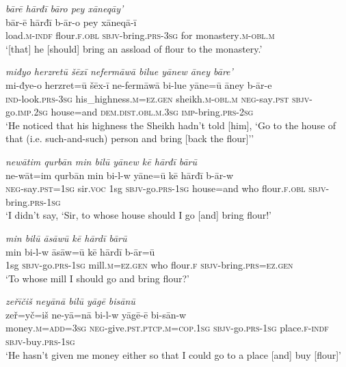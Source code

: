 \ea \label{HB.14}
\textit{bārē hārđī bāro pey xāneqāy’} \\ 
\gll bār-ē hārđī b-ār-o pey xāneqā-ī \\ 
 load\textsc{.m}\textsc{-indf} flour\textsc{\textsc{.f}}\textsc{.obl} \textsc{sbjv-}bring\textsc{.prs}\textsc{-3sg} for monastery\textsc{.m}\textsc{-obl}\textsc{.m} \\ 
\glt `[that] he [should] bring an assload of flour to the monastery.'
\z 
 
\ea \label{HB.17}
\textit{miđyo herzretū šēxī nefermāwā bilue yānew āney bāre’} \\ 
\gll mi-đye-o herzret=ū šēx-ī ne-fermāwā bi-lue yāne=ū āney b-ār-e \\ 
 \textsc{ind-}look\textsc{.prs}\textsc{-3sg} his\_highness\textsc{.m}\textsc{=ez}\textsc{.gen} sheikh\textsc{.m}\textsc{-obl}\textsc{.m} \textsc{neg-}say\textsc{.pst} \textsc{sbjv-}go\textsc{.imp}\textsc{.\textsc{2sg}} house=and \textsc{dem.dist}\textsc{.obl}\textsc{.m}\textsc{.3sg} \textsc{imp-}bring\textsc{.prs}-\textsc{2sg} \\ 
\glt `He noticed that his highness the Sheikh hadn’t told [him], ‘Go to the house of that (i.e. such-and-such) person and bring [back the flour]’'
\z 
 
\ea \label{HB.20}
\textit{newātim qurbān min bilū yānew kē hārđī bārū} \\ 
\gll ne-wāt=im qurbān min bi-l-w yāne=ū kē hārđī b-ār-w \\ 
 \textsc{neg-}say\textsc{.pst}\textsc{=1sg} sir.\textsc{voc} 1sg \textsc{sbjv-}go\textsc{.prs}\textsc{-1sg} house=and who flour\textsc{\textsc{.f}}\textsc{.obl} \textsc{sbjv-}bring\textsc{.prs}\textsc{-1sg} \\ 
\glt `I didn’t say, ‘Sir, to whose house should I go [and] bring flour!'
\z 
 
\ea \label{HB.21}
\textit{min bilū āsāwū kē hārdī bārū} \\ 
\gll min bi-l-w āsāw=ū kē hārdī b-ār=ū \\ 
 1sg \textsc{sbjv-}go\textsc{.prs}\textsc{-1sg} mill\textsc{.m}\textsc{=ez}\textsc{.gen} who flour\textsc{\textsc{.f}} \textsc{sbjv-}bring\textsc{.prs}\textsc{=ez}\textsc{.gen} \\ 
\glt `To whose mill I should go and bring flour?'
\z 
 
\ea \label{HB.22}
\textit{zeřīčiš neyānā bilū yāgē bisānū} \\ 
\gll zeř=yč=iš ne-yā=nā bi-l-w yāgē-ē bi-sān-w \\ 
 money\textsc{.m}\textsc{=add}\textsc{=3sg} \textsc{neg-}give\textsc{.pst}\textsc{.ptcp}\textsc{.m}\textsc{=cop}\textsc{.1sg} \textsc{sbjv-}go\textsc{.prs}\textsc{-1sg} place\textsc{\textsc{.f}}\textsc{-indf} \textsc{sbjv-}buy\textsc{.prs}\textsc{-1sg} \\ 
\glt `He hasn’t given me money either so that I could go to a place [and] buy [flour]'
\z 
 
